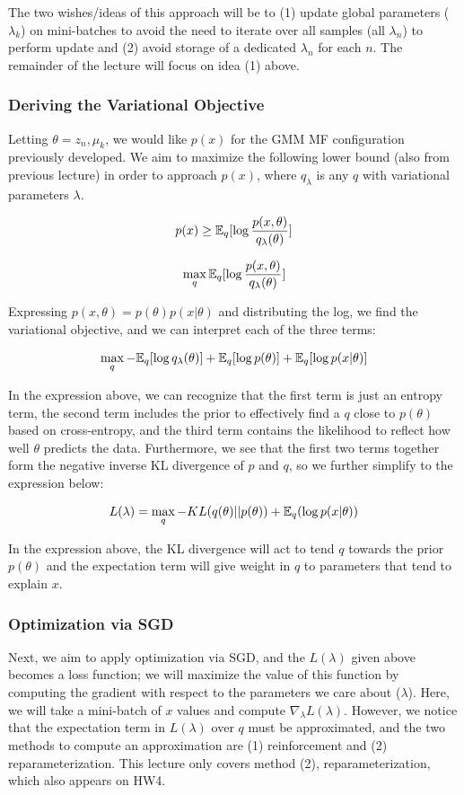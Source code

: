 \documentclass{article}
\begin{document}
The two wishes/ideas of this approach will be to (1) update global parameters ($\lambda_k$) on mini-batches to avoid the need to iterate over all samples (all $\lambda_n$) to perform update and (2) avoid storage of a dedicated $\lambda_n$ for each $n$.
The remainder of the lecture will focus on idea (1) above.


\subsubsection{Deriving the Variational Objective}

Letting $\theta = {z_n, \mu_k}$, we would like $p(x)$ for the GMM MF configuration previously developed.  
We aim to maximize the following lower bound (also from previous lecture) in order to approach $p(x)$, where $q_{\lambda}$ is any $q$ with variational parameters $\lambda$.

$$
p(x) \geq \mathbb{E}_q [\log{\frac{p(x, \theta)}{q_{\lambda}(\theta)}} ]
$$

$$
\max_{q} \mathbb{E}_q [\log{\frac{p(x, \theta)}{q_{\lambda}(\theta)}} ]
$$

Expressing $p(x, \theta) = p(\theta) p(x|\theta)$ and distributing the log, we find the variational objective, and we can interpret each of the three terms:

$$
\max_{q} - \mathbb{E}_q [\log{q_{\lambda}(\theta)} ] + \mathbb{E}_q [\log{p(\theta)} ] + \mathbb{E}_q [\log{p(x|\theta)} ]
$$

In the expression above, we can recognize that the first term is just an entropy term, the second term includes the prior to effectively find a $q$ close to $p(\theta)$ based on cross-entropy, and the third term contains the likelihood to reflect how well $\theta$ predicts the data.  
Furthermore, we see that the first two terms together form the negative inverse KL divergence of $p$ and $q$, so we further simplify to the expression below:

$$
L(\lambda) = \max_{q} - KL(q(\theta) || p(\theta)) + \mathbb{E}_q (\log{p(x|\theta)})
$$

In the expression above, the KL divergence will act to tend $q$ towards the prior $p(\theta)$ and the expectation term will give weight in $q$ to parameters that tend to explain $x$.

\subsubsection{Optimization via SGD}

Next, we aim to apply optimization via SGD, and the $L(\lambda)$ given above becomes a loss function; we will maximize the value of this function by computing the gradient with respect to the parameters we care about ($\lambda$).  
Here, we will take a mini-batch of $x$ values and compute $\nabla_{\lambda} L(\lambda)$.  
However, we notice that the expectation term in $L(\lambda)$ over $q$ must be approximated, and the two methods to compute an approximation are (1) reinforcement and (2) reparameterization.
This lecture only covers method (2), reparameterization, which also appears on HW4.
\end{document}
